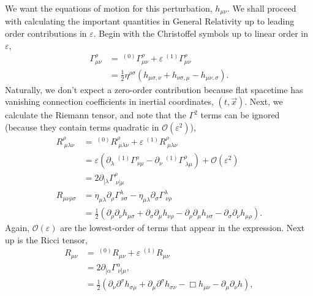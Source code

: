 We want the equations of motion for this perturbation, $h_{\mu\nu}$. We shall proceed with calculating the important quantities in General Relativity up to leading order contributions in $\varepsilon$. Begin with the Christoffel symbols up to linear order in $\varepsilon$,
\begin{equation}
\begin{split}
    \Gamma^{\rho}_{\mu\nu}&= \ ^{(0)}\Gamma^{\rho}_{\mu\nu}+\varepsilon \ ^{(1)}\Gamma^{\rho}_{\mu\nu} \\
    &= \frac{1}{2}\eta^{\rho\sigma}\left( h_{\mu\sigma,\nu} + h_{\nu\sigma,\mu} - h_{\mu\nu,\sigma}\right).
\end{split}
\end{equation}
Naturally, we don't expect a zero-order contribution because flat spacetime has vanishing connection coefficients in inertial coordinates, $(t,\vec{x})$. Next, we calculate the Riemann tensor, and note that the $\Gamma^2$ terms can be ignored (because they contain terms quadratic in $\mathcal{O}(\varepsilon^2)$),
\begin{equation}
\begin{split}
    R^{\rho}_{\ \mu \lambda \nu} &= \ ^{(0)}R^{\rho}_{\ \mu \lambda \nu} + \varepsilon \ ^{(1)}R^{\rho}_{\ \mu \lambda \nu}\\ 
    &=\varepsilon \left(\partial_{\lambda}\ ^{(1)}\Gamma^{\rho}_{\ \nu \mu} - \partial_{\nu}\ ^{(1)}\Gamma^{\rho}_{\ \lambda \mu}\right) + \mathcal{O}(\varepsilon^2)\\
    &= 2 \partial_{[\lambda}\Gamma^{\rho}_{\ \nu]\mu}\\
    R_{\mu\nu\rho\sigma}&= \eta_{\mu\lambda}\partial_{\rho}\Gamma^{\lambda}_{\ \nu\sigma} - \eta_{\mu\lambda}\partial_{\sigma}\Gamma^{\lambda}_{\ \nu\rho} \\
    &= \frac{1}{2}\left(\partial_{\rho}\partial_{\nu}h_{\mu\sigma} + \partial_{\sigma}\partial_{\mu}h_{\nu\rho} - \partial_{\rho}\partial_{\mu}h_{\nu\sigma} - \partial_{\sigma}\partial_{\nu} h_{\mu\rho}\right).
\end{split}
\end{equation}
Again, $\mathcal{O}(\varepsilon)$ are the lowest-order of terms that appear in the expression. Next up is the Ricci tensor, 
\begin{equation}
\begin{split}
    R_{\mu\nu} &= \ ^{(0)}R_{\mu\nu} + \varepsilon \ ^{(1)}R_{\mu\nu}\\ 
    &= 2\partial_{[\alpha}\Gamma^{\alpha}_{\ \nu]\mu},\\
    &=\frac{1}{2}\left(\partial_{\nu}\partial^{\sigma}h_{\sigma\mu} + \partial_{\mu}\partial^{\sigma}h_{\sigma\nu} - \Box h_{\mu\nu} - \partial_{\mu}\partial_{\nu}h\right),
\end{split}
\end{equation}
